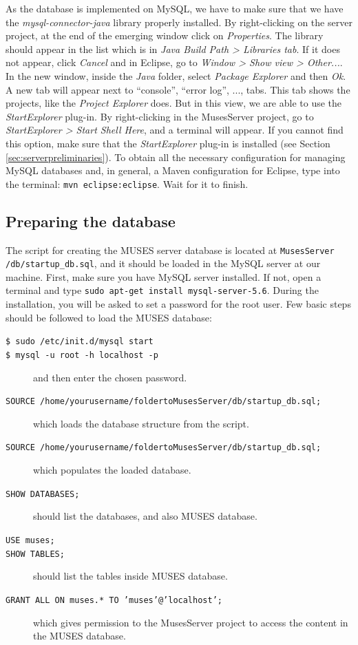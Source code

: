 \documentclass[a4paper,11pt]{book}
\begin{document}
As the database is implemented on MySQL, we have to make sure that we have the \textit{mysql-connector-java} library properly installed. By right-clicking on the server project, at the end of the emerging window click on \textit{Properties}. The library should appear in the list which is in \textit{Java Build Path > Libraries tab}. If it does not appear, click \textit{Cancel} and in Eclipse, go to \textit{Window > Show view > Other...}. In the new window, inside the \textit{Java} folder, select \textit{Package Explorer} and then \textit{Ok}. A new tab will appear next to ``console'', ``error log'', ..., tabs. This tab shows the projects, like the \textit{Project Explorer} does. But in this view, we are able to use the \textit{StartExplorer} plug-in. By right-clicking in the MusesServer project, go to \textit{StartExplorer > Start Shell Here}, and a terminal will appear. If you cannot find this option, make sure that the \textit{StartExplorer} plug-in is installed (see Section \ref{sec:serverpreliminaries}). To obtain all the necessary configuration for managing MySQL databases and, in general, a Maven configuration for Eclipse, type into the terminal: \texttt{mvn eclipse:eclipse}. Wait for it to finish.

\subsection{Preparing the database}
\label{subsec:database}

The script for creating the MUSES server database is located at \texttt{MusesServer\\/db/startup\_db.sql}, and it should be loaded in the MySQL server at our machine. First, make sure you have MySQL server installed. If not, open a terminal and type \texttt{sudo apt-get install mysql-server-5.6}. During the installation, you will be asked to set a password for the root user. Few basic steps \cite{mysqlguide:site} should be followed to load the MUSES database:

\begin{description}
  \item[\texttt{\$ sudo /etc/init.d/mysql start}] 
  \item[\texttt{\$ mysql -u root -h localhost -p}] and then enter the chosen password.
  \item[\texttt{SOURCE /home/yourusername/foldertoMusesServer/db/startup\_db.sql;}] which loads the database structure from the script.
  \item[\texttt{SOURCE /home/yourusername/foldertoMusesServer/db/startup\_db.sql;}] which populates the loaded database.
  \item[\texttt{SHOW DATABASES;}] should list the databases, and also MUSES database.
  \item[\texttt{USE muses;}]
  \item[\texttt{SHOW TABLES;}] should list the tables inside MUSES database.
  \item[\texttt{GRANT ALL ON muses.* TO 'muses'@'localhost';}] which gives permission to the MusesServer project to access the content in the MUSES database.
\end{description}
\end{document}
